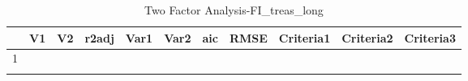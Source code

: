 \begin{longtable}{rllrrrrrlll}
  \hline
 & V1 & V2 & r2adj & Var1 & Var2 & aic & RMSE & Criteria1 & Criteria2 & Criteria3 \\ 
  \hline
1 &  &  &  &  &  &  &  &  &  &  \\ 
   \hline
\hline
\caption{Two Factor Analysis-FI_treas_long} 
\end{longtable}
